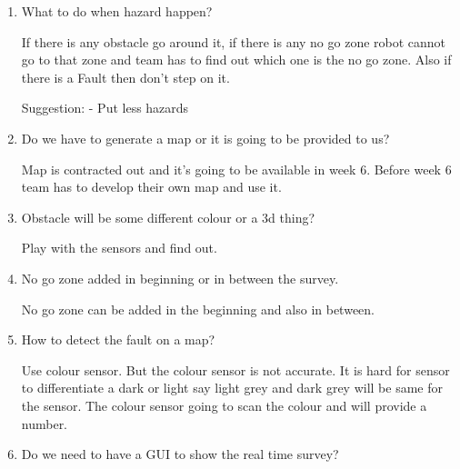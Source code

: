 \documentclass[11pt]{article}
\begin{document}
                          \begin{enumerate}

\item What to do when hazard happen?



If there is any obstacle go around it, if there is any no go zone robot cannot go to that zone and team has to find out which one is the no go zone. Also if there is a Fault then don’t step on it.



  \begin{flushleft}

 Suggestion: - Put less hazards                      

\end{flushleft}     











\item Do we have to generate a map or it is going to be provided to us?



Map is contracted out and it’s going to be available in week 6. Before week 6 team has to develop their own map and use it.



\item Obstacle will be some different colour or a 3d thing?



Play with the sensors and find out.



\item No go zone added in beginning or in between the survey.



No go zone can be added in the beginning and also in between.



\item How to detect the fault on a map?



Use colour sensor. But the colour sensor is not accurate. It is hard for sensor to differentiate a dark or light say light grey and dark grey will be same for the sensor. The colour sensor going to scan the colour and will provide a number.



\item Do we need to have a GUI to show the real time survey?




\end{enumerate}
\end{document}
